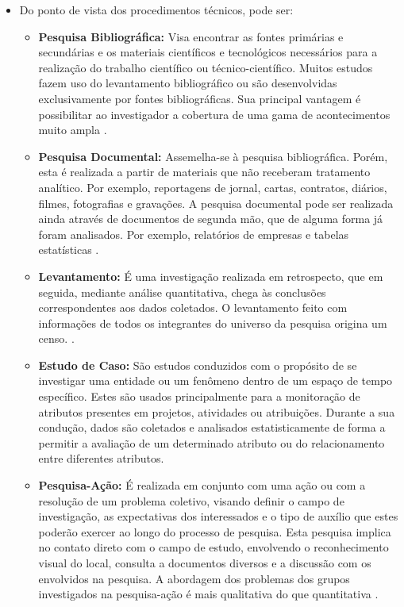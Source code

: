 \begin{itemize}
	\item Do ponto de vista dos procedimentos técnicos, pode ser:
		\begin{itemize}
			\item \textbf{Pesquisa Bibliográfica:} Visa encontrar as fontes primárias e secundárias e os materiais científicos e tecnológicos necessários para a realização do trabalho científico ou técnico-científico. Muitos estudos fazem uso do levantamento bibliográfico ou são desenvolvidas exclusivamente por fontes bibliográficas. Sua principal vantagem é possibilitar ao investigador a cobertura de uma gama de acontecimentos muito ampla \cite{Silva:Tafner:2007}.

			\item \textbf{Pesquisa Documental:} Assemelha-se à pesquisa bibliográfica. Porém, esta é realizada a partir de materiais que não receberam tratamento analítico. Por exemplo, reportagens de jornal, cartas, contratos, diários, filmes, fotografias e gravações. A pesquisa documental pode ser realizada ainda através de documentos de segunda mão, que de alguma forma já foram analisados. Por exemplo, relatórios de empresas e tabelas estatísticas \cite{Gil:2010}.

			\item \textbf{Levantamento:} É uma investigação realizada em retrospecto, que em seguida, mediante análise quantitativa, chega às conclusões correspondentes aos dados coletados. O levantamento feito com informações de todos os integrantes do universo da pesquisa origina um censo. \cite{Mafra:Travassos:2006}.
			
			\item \textbf{Estudo de Caso:} São estudos conduzidos com o propósito de se investigar uma entidade ou um fenômeno dentro de um espaço de tempo específico. Estes são usados principalmente para a monitoração de atributos presentes em projetos, atividades ou atribuições. Durante a sua condução, dados são coletados e analisados estatisticamente de forma a permitir a avaliação de um determinado atributo ou do relacionamento entre diferentes atributos. \cite{Mafra:Travassos:2006}
			
			\item \textbf{Pesquisa-Ação:} É realizada em conjunto com uma ação ou com a resolução de um problema coletivo, visando definir o campo de investigação, as expectativas dos interessados e o tipo de auxílio que estes poderão exercer ao longo do processo de pesquisa. Esta pesquisa implica no contato direto com o campo de estudo, envolvendo o reconhecimento visual do local, consulta a documentos diversos e a discussão com os envolvidos na pesquisa. A abordagem dos problemas dos grupos investigados na pesquisa-ação é mais qualitativa do que quantitativa \cite{Silva:Tafner:2007}.
			

\end{itemize}
\end{itemize}
